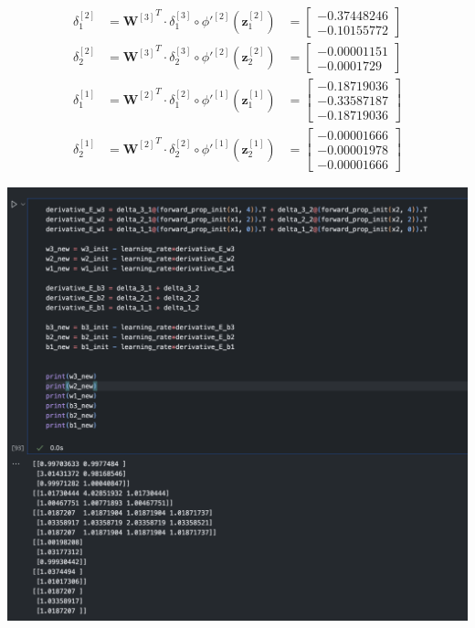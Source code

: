 \documentclass[12pt]{article}
\begin{document}
\begin{enumerate}[leftmargin=\labelsep]
    \begin{equation}
    \begin{aligned}
        \delta_1^{[2]} &= {\mathbf{W}^{[3]}}^T \cdot \delta_1^{[3]} \circ \phi'^{[2]}(\mathbf{z}_1^{[2]})
        &= \begin{bmatrix}
            -0.37448246 \\ -0.10155772
        \end{bmatrix} \\
        \delta_2^{[2]} &= {\mathbf{W}^{[3]}}^T \cdot \delta_2^{[3]} \circ \phi'^{[2]}(\mathbf{z}_2^{[2]})
        &= \begin{bmatrix}
            -0.00001151 \\ -0.0001729 
        \end{bmatrix} \\
        \delta_1^{[1]} &= {\mathbf{W}^{[2]}}^T \cdot \delta_1^{[2]} \circ \phi'^{[1]}(\mathbf{z}_1^{[1]})
        &= \begin{bmatrix}
            -0.18719036 \\ -0.33587187 \\ -0.18719036
        \end{bmatrix} \\
        \delta_2^{[1]} &= {\mathbf{W}^{[2]}}^T \cdot \delta_2^{[2]} \circ \phi'^{[1]}(\mathbf{z}_2^{[1]})
        &= \begin{bmatrix}
            -0.00001666 \\ -0.00001978 \\ -0.00001666
        \end{bmatrix}
    \end{aligned}
    \end{equation}

    \begin{center}
        \includegraphics[scale=0.3]{images/code5.png}
    \end{center}


\end{enumerate}
\end{document}
